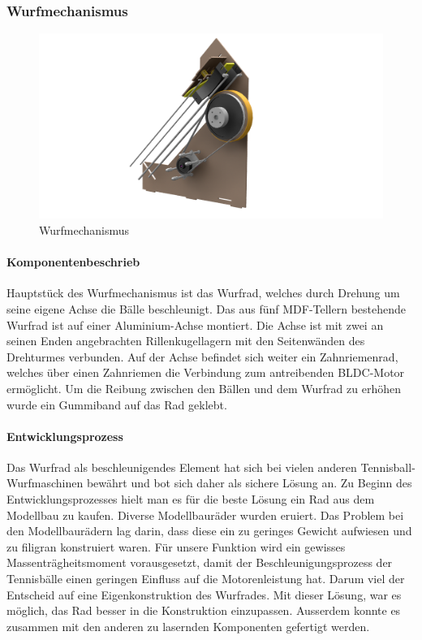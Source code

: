 \subsubsection{Wurfmechanismus}
\begin{figure}[h!]
	\centering
	\includegraphics[width=\linewidth]{../../fig/Wurfmechanismus}
	\caption{Wurfmechanismus}
	\label{fig:Wurfmechanismus}
\end{figure}
\paragraph{Komponentenbeschrieb\\}
Hauptstück des Wurfmechanismus ist das Wurfrad, welches durch Drehung um seine eigene Achse die Bälle beschleunigt.
Das aus fünf MDF-Tellern bestehende Wurfrad ist auf einer  Aluminium-Achse montiert. Die Achse ist mit zwei an seinen Enden angebrachten Rillenkugellagern mit den Seitenwänden des Drehturmes verbunden. Auf der Achse befindet sich weiter ein Zahnriemenrad, welches über einen Zahnriemen die Verbindung zum antreibenden BLDC-Motor ermöglicht.
Um die Reibung zwischen den Bällen und dem Wurfrad zu erhöhen wurde ein Gummiband auf das Rad geklebt.

\paragraph{Entwicklungsprozess\\}
Das Wurfrad als beschleunigendes Element hat sich bei vielen anderen Tennisball-Wurfmaschinen bewährt und bot sich daher als sichere Lösung an.
Zu Beginn des Entwicklungsprozesses hielt man es für die beste Lösung ein Rad aus dem Modellbau zu kaufen. Diverse Modellbauräder wurden eruiert. Das Problem bei den Modellbaurädern lag darin, dass diese ein zu geringes Gewicht aufwiesen und zu filigran konstruiert waren. Für unsere Funktion wird ein gewisses Massenträgheitsmoment vorausgesetzt, damit der Beschleunigungsprozess der Tennisbälle einen geringen Einfluss auf die Motorenleistung hat. Darum viel der Entscheid auf eine Eigenkonstruktion des Wurfrades. Mit dieser Lösung, war es möglich, das Rad besser in die Konstruktion einzupassen. Ausserdem konnte es zusammen mit den anderen zu lasernden Komponenten gefertigt werden.